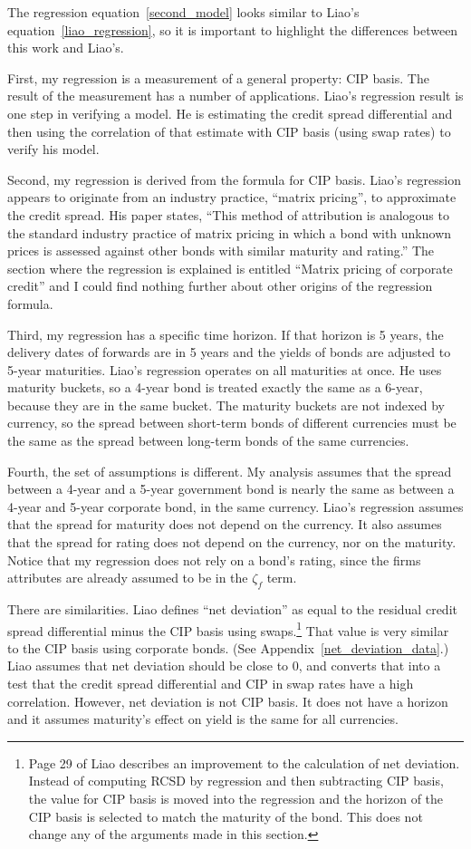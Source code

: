 The regression equation~\eqref{second_model} looks similar to Liao's equation~\eqref{liao_regression}, so it is important to highlight the differences between this work and Liao's.

First, my regression is a measurement of a general property: CIP basis.  The result of the measurement has a number of applications.  Liao's regression result is one step in verifying a model.  He is estimating the credit spread differential and then using the correlation of that estimate with CIP basis (using swap rates) to verify his model.  

Second, my regression is derived from the formula for CIP basis.  Liao's regression appears to originate from an industry practice, ``matrix pricing'', to approximate the credit spread.  His paper states, ``This method of attribution is analogous to the standard industry practice of matrix pricing in which a bond with unknown prices is assessed against other bonds with similar maturity and rating.''  The section where the regression is explained is entitled ``Matrix pricing of corporate credit'' and I could find nothing further about other origins of the regression formula.

Third, my regression has a specific time horizon.  If that horizon is 5 years, the delivery dates of forwards are in 5 years and the yields of bonds are adjusted to 5-year maturities.  Liao's regression operates on all maturities at once.  He uses maturity buckets, so a 4-year bond is treated exactly the same as a 6-year, because they are in the same bucket.  The maturity buckets are not indexed by currency, so the spread between short-term bonds of different currencies must be the same as the spread between long-term bonds of the same currencies.

Fourth, the set of assumptions is different.  My analysis assumes that the spread between a 4-year and a 5-year government bond is nearly the same as between a 4-year and 5-year corporate bond, in the same currency.  Liao's regression assumes that the spread for maturity does not depend on the currency.  It also assumes that the spread for rating does not depend on the currency, nor on the maturity.  Notice that my regression does not rely on a bond's rating, since the firms attributes are already assumed to be in the $\zeta_f$ term.

There are similarities.  Liao defines ``net deviation'' as equal to the residual credit spread differential minus the CIP basis using swaps.\footnote{Page 29 of Liao\cite{Liao2016} describes an improvement to the calculation of net deviation.  Instead of computing RCSD by regression and then subtracting CIP basis, the value for CIP basis is moved into the regression and the horizon of the CIP basis is selected to match the maturity of the bond.  This does not change any of the arguments made in this section.}  That value is very similar to the CIP basis using corporate bonds.  (See Appendix~\ref{net_deviation_data}.)  Liao assumes that net deviation should be close to 0, and converts that into a test that the credit spread differential and CIP in swap rates have a high correlation.  However, net deviation is not CIP basis.  It does not have a horizon and it assumes maturity's effect on yield is the same for all currencies.

